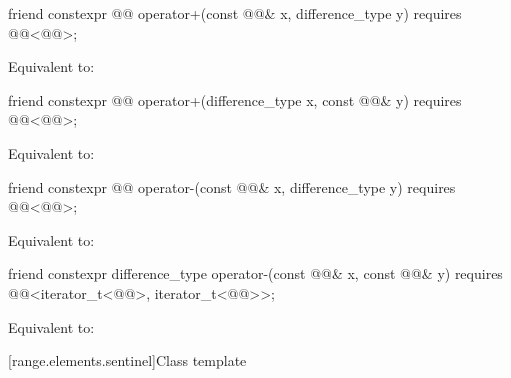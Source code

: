 %
\begin{itemdecl}
friend constexpr @@ operator+(const @@& x, difference_type y)
  requires @@<@@>;
\end{itemdecl}

\begin{itemdescr}
\pnum
\effects
Equivalent to: 
\end{itemdescr}

%
\begin{itemdecl}
friend constexpr @@ operator+(difference_type x, const @@& y)
  requires @@<@@>;
\end{itemdecl}

\begin{itemdescr}
\pnum
\effects
Equivalent to: 
\end{itemdescr}

%
\begin{itemdecl}
friend constexpr @@ operator-(const @@& x, difference_type y)
  requires @@<@@>;
\end{itemdecl}

\begin{itemdescr}
\pnum
\effects
Equivalent to: 
\end{itemdescr}

%
\begin{itemdecl}
friend constexpr difference_type operator-(const @@& x, const @@& y)
  requires @@<iterator_t<@@>, iterator_t<@@>>;
\end{itemdecl}

\begin{itemdescr}
\pnum
\effects
Equivalent to: 
\end{itemdescr}

[range.elements.sentinel]{Class template }

